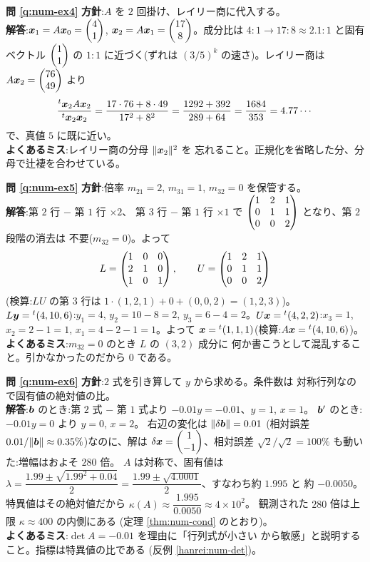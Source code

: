 \bigskip
\noindent\textbf{問 \ref{q:num-ex4}}\quad
\textbf{方針}:$A$ を $2$ 回掛け、レイリー商に代入する。\\
\textbf{解答}:$\bm{x}_1 = A\bm{x}_0 = \begin{pmatrix}4 \\ 1\end{pmatrix}$,
$\bm{x}_2 = A\bm{x}_1 = \begin{pmatrix}17 \\ 8\end{pmatrix}$。成分比は
$4 : 1 \to 17 : 8 \approx 2.1 : 1$ と固有ベクトル $\begin{pmatrix}1 \\ 1\end{pmatrix}$ の
$1 : 1$ に近づく(ずれは $(3/5)^k$ の速さ)。レイリー商は
$A\bm{x}_2 = \begin{pmatrix}76 \\ 49\end{pmatrix}$ より
\[
\frac{{}^t\bm{x}_2 A\bm{x}_2}{{}^t\bm{x}_2\bm{x}_2}
= \frac{17 \cdot 76 + 8 \cdot 49}{17^2 + 8^2}
= \frac{1292 + 392}{289 + 64} = \frac{1684}{353} = 4.77\cdots
\]
で、真値 $5$ に既に近い。\\
\textbf{よくあるミス}:レイリー商の分母 $\|\bm{x}_2\|^2$ を
忘れること。正規化を省略した分、分母で辻褄を合わせている。

\bigskip
\noindent\textbf{問 \ref{q:num-ex5}}\quad
\textbf{方針}:倍率 $m_{21} = 2$, $m_{31} = 1$, $m_{32} = 0$ を保管する。\\
\textbf{解答}:第 $2$ 行 $-$ 第 $1$ 行 $\times 2$、
第 $3$ 行 $-$ 第 $1$ 行 $\times 1$ で
$\begin{pmatrix}1 & 2 & 1 \\ 0 & 1 & 1 \\ 0 & 0 & 2\end{pmatrix}$ となり、第 $2$ 段階の消去は
不要($m_{32} = 0$)。よって
\[
L = \begin{pmatrix}1 & 0 & 0 \\ 2 & 1 & 0 \\ 1 & 0 & 1\end{pmatrix}, \qquad
U = \begin{pmatrix}1 & 2 & 1 \\ 0 & 1 & 1 \\ 0 & 0 & 2\end{pmatrix}
\]
(検算:$LU$ の第 $3$ 行は $1 \cdot (1,2,1) + 0 + (0,0,2) = (1,2,3)$)。
$L\bm{y} = {}^t(4, 10, 6)$:$y_1 = 4$, $y_2 = 10 - 8 = 2$,
$y_3 = 6 - 4 = 2$。$U\bm{x} = {}^t(4, 2, 2)$:$x_3 = 1$,
$x_2 = 2 - 1 = 1$, $x_1 = 4 - 2 - 1 = 1$。よって
$\bm{x} = {}^t(1, 1, 1)$(検算:$A\bm{x} = {}^t(4, 10, 6)$)。\\
\textbf{よくあるミス}:$m_{32} = 0$ のとき $L$ の $(3,2)$ 成分に
何か書こうとして混乱すること。引かなかったのだから $0$ である。

\bigskip
\noindent\textbf{問 \ref{q:num-ex6}}\quad
\textbf{方針}:$2$ 式を引き算して $y$ から求める。条件数は
対称行列なので固有値の絶対値の比。\\
\textbf{解答}:$\bm{b}$ のとき:第 $2$ 式 $-$ 第 $1$ 式より
$-0.01y = -0.01$、$y = 1$, $x = 1$。
$\bm{b}'$ のとき:$-0.01y = 0$ より $y = 0$, $x = 2$。
右辺の変化は $\|\delta\bm{b}\| = 0.01$
(相対誤差 $0.01/\|\bm{b}\| \approx 0.35\%$)なのに、解は
$\delta\bm{x} = \begin{pmatrix}1 \\ -1\end{pmatrix}$、相対誤差
$\sqrt{2}/\sqrt{2} = 100\%$ も動いた:増幅はおよそ $280$ 倍。
$A$ は対称で、固有値は
$\lambda = \dfrac{1.99 \pm \sqrt{1.99^2 + 0.04}}{2}
= \dfrac{1.99 \pm \sqrt{4.0001}}{2}$、すなわち約 $1.995$ と
約 $-0.0050$。特異値はその絶対値だから
$\kappa(A) \approx \dfrac{1.995}{0.0050} \approx 4 \times 10^2$。
観測された $280$ 倍は上限 $\kappa \approx 400$ の内側にある
(定理 \ref{thm:num-cond} のとおり)。\\
\textbf{よくあるミス}:$\det A = -0.01$ を理由に「行列式が小さい
から敏感」と説明すること。指標は特異値の比である
(反例 \ref{hanrei:num-det})。

